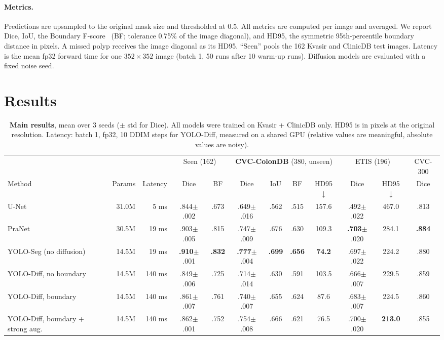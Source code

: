 \documentclass[10pt,twocolumn,letterpaper]{article}
\newcommand{\best}[1]{\textbf{#1}}
\newcommand{\pmstd}[1]{{\scriptsize$\pm$#1}}
\begin{document}
\paragraph{Metrics.} Predictions are upsampled to the original mask size and thresholded at 0.5. All metrics are computed per image and averaged. We report Dice, IoU, the Boundary F-score~\cite{csurka2013bf} (BF; tolerance 0.75\% of the image diagonal), and HD95, the symmetric 95th-percentile boundary distance in pixels. A missed polyp receives the image diagonal as its HD95. ``Seen'' pools the 162 Kvasir and ClinicDB test images. Latency is the mean fp32 forward time for one $352\times352$ image (batch 1, 50 runs after 10 warm-up runs). Diffusion models are evaluated with a fixed noise seed.

\section{Results}
\label{sec:results}

\begin{table}[t]
\centering
\footnotesize
\setlength{\tabcolsep}{4pt}
\begin{tabular}{@{}lrr|cc|cccc|cc|c@{}}
\toprule
& & & \multicolumn{2}{c|}{Seen (162)} & \multicolumn{4}{c|}{\textbf{CVC-ColonDB} (380, unseen)} & \multicolumn{2}{c|}{ETIS (196)} & CVC-300 \\
Method & Params & Latency & Dice & BF & Dice & IoU & BF & HD95$\downarrow$ & Dice & HD95$\downarrow$ & Dice \\
\midrule
U-Net~\cite{ronneberger2015unet} & 31.0M & 5 ms & .844\pmstd{.002} & .673 & .649\pmstd{.016} & .562 & .515 & 157.6 & .492\pmstd{.022} & 467.0 & .813 \\
PraNet~\cite{fan2020pranet} & 30.5M & 19 ms & .903\pmstd{.005} & .815 & .747\pmstd{.009} & .676 & .630 & 109.3 & \best{.703}\pmstd{.020} & 284.1 & \best{.884} \\
\midrule
YOLO-Seg (no diffusion) & 14.5M & 19 ms & \best{.910}\pmstd{.001} & \best{.832} & \best{.777}\pmstd{.004} & \best{.699} & \best{.656} & \best{74.2} & .697\pmstd{.022} & 224.2 & .880 \\
YOLO-Diff, no boundary & 14.5M & 140 ms & .849\pmstd{.006} & .725 & .714\pmstd{.014} & .630 & .591 & 103.5 & .666\pmstd{.007} & 229.5 & .859 \\
YOLO-Diff, boundary & 14.5M & 140 ms & .861\pmstd{.007} & .761 & .740\pmstd{.007} & .655 & .624 & 87.6 & .683\pmstd{.007} & 224.5 & .860 \\
YOLO-Diff, boundary + strong aug. & 14.5M & 140 ms & .862\pmstd{.001} & .752 & .754\pmstd{.008} & .666 & .621 & 76.5 & .700\pmstd{.020} & \best{213.0} & .855 \\
\bottomrule
\end{tabular}
\caption{\textbf{Main results}, mean over 3 seeds ($\pm$ std for Dice). All models were trained on Kvasir + ClinicDB only. HD95 is in pixels at the original resolution. Latency: batch 1, fp32, 10 DDIM steps for YOLO-Diff, measured on a shared GPU (relative values are meaningful, absolute values are noisy).}
\label{tab:main}
\end{table}
\end{document}
